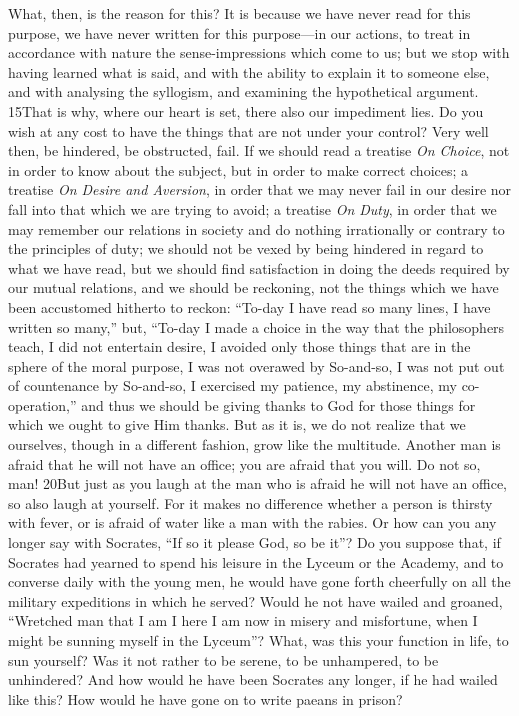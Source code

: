 What, then, is the reason for this? It is because we have never read for this purpose, we have never written for this purpose—in our actions, to treat in accordance with nature the sense-impressions which come to us; but we stop with having learned what is said, and with the ability to explain it to someone else, and with analysing the syllogism, and examining the hypothetical argument. 15That is why, where our heart is set, there also our impediment lies. Do you wish at any cost to have the things that are not under your control? Very well then, be hindered, be obstructed, fail. If we should read a treatise \emph{On Choice}, not in order to know about the subject, but in order to make correct choices; a treatise \emph{On Desire and Aversion}, in order that we may never fail in our desire nor fall into that which we are trying to avoid; a treatise \emph{On Duty}, in order that we may remember our relations in society and do nothing irrationally or contrary to the principles of duty; we should not be vexed by being hindered in regard to what we have read, but we should find satisfaction in doing the deeds required by our mutual relations, and we should be reckoning, not the things which we have been accustomed hitherto to reckon: ``To-day I have read so many lines, I have written so many,'' but, ``To-day I made a choice in the way that the philosophers teach, I did not entertain desire, I avoided only those things that are in the sphere of the moral purpose, I was not overawed by So-and-so, I was not put out of countenance by So-and-so, I exercised my patience, my abstinence, my co-operation,'' and thus we should be giving thanks to God for those things for which we ought to give Him thanks. But as it is, we do not realize that we ourselves, though in a different fashion, grow like the multitude. Another man is afraid that he will not have an office; you are afraid that you will. Do not so, man! 20But just as you laugh at the man who is afraid he will not have an office, so also laugh at yourself. For it makes no difference whether a person is thirsty with fever, or is afraid of water like a man with the rabies. Or how can you any longer say with Socrates, ``If so it please God, so be it''? Do you suppose that, if Socrates had yearned to spend his leisure in the Lyceum or the Academy, and to converse daily with the young men, he would have gone forth cheerfully on all the military expeditions in which he served? Would he not have wailed and groaned, ``Wretched man that I am I here I am now in misery and misfortune, when I might be sunning myself in the Lyceum''? What, was this your function in life, to sun yourself? Was it not rather to be serene, to be unhampered, to be unhindered? And how would he have been Socrates any longer, if he had wailed like this? How would he have gone on to write paeans in prison?

